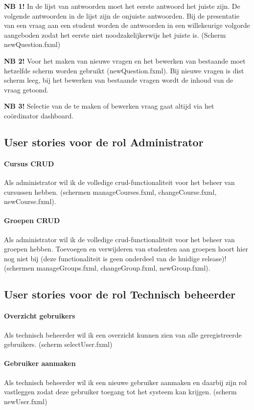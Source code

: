 \documentclass[11pt, a4paper]{article}
\begin{document}
\textbf{NB 1!} In de lijst van antwoorden moet het eerste antwoord het juiste zijn.
De volgende antwoorden in de lijst zijn de onjuiste antwoorden.
Bij de presentatie van een vraag aan een student worden de antwoorden in een willekeurige volgorde aangeboden zodat het eerste niet noodzakelijkerwijs het juiste is. (Scherm newQuestion.fxml)

\textbf{NB 2!} Voor het maken van nieuwe vragen en het bewerken van bestaande moet hetzelfde scherm worden gebruikt (newQuestion.fxml).
Bij nieuwe vragen is dist scherm leeg, bij het bewerken van bestaande vragen wordt de inhoud van de vraag getoond.

\textbf{NB 3!} Selectie van de te maken of bewerken vraag gaat altijd via het co\"ordinator dashboard.

\subsection{User stories voor de rol Administrator}

\paragraph{Cursus CRUD}
Als administrator wil ik de volledige crud-functionaliteit voor het beheer van cursussen hebben. (schermen manageCourses.fxml, changeCourse.fxml, newCourse.fxml).

\paragraph{Groepen CRUD}
Als administrator wil ik de volledige crud-functionaliteit voor het beheer van groepen hebben. Toevoegen en verwijderen van studenten aan groepen hoort hier nog niet bij (deze functionaliteit is geen onderdeel van de huidige release)! (schermen manageGroups.fxml, changeGroup.fxml, newGroup.fxml).

\subsection{User stories voor de rol Technisch beheerder}

\paragraph{Overzicht gebruikers} Als technisch beheerder wil ik een overzicht kunnen zien van alle geregistreerde gebruikers. (scherm selectUser.fxml)

\paragraph{Gebruiker aanmaken} Als technisch beheerder wil ik een nieuwe gebruiker aanmaken en daarbij zijn rol vastleggen zodat deze gebruiker toegang tot het systeem kan krijgen. (scherm newUser.fxml)
\end{document}
